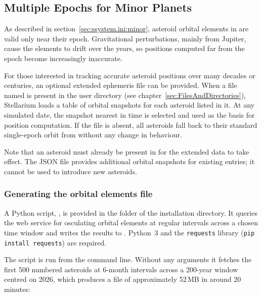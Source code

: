 \subsection{Multiple Epochs for Minor Planets}
\label{sec:ssystem.ini:MultiEpoch}
 
As described in section~\ref{sec:ssystem.ini:minor}, asteroid orbital
elements in  are valid only near their epoch.
Gravitational perturbations, mainly from Jupiter, cause the elements to
drift over the years, so positions computed far from the epoch become
increasingly inaccurate.
 
For those interested in tracking accurate asteroid positions over many
decades or centuries, an optional extended ephemeris file can be
provided.  When a file named  is present
in the user  directory (see
chapter~\ref{sec:FilesAndDirectories}), Stellarium loads a table of
orbital snapshots for each asteroid listed in it.  At any simulated
date, the snapshot nearest in time is selected and used as the basis for
position computation.  If the file is absent, all asteroids fall back to
their standard single-epoch orbit from 
without any change in behaviour.
 
Note that an asteroid must already be present in
 for the extended data to take effect.  The
JSON file provides additional orbital snapshots for existing entries; it
cannot be used to introduce new asteroids.
 
\subsubsection{Generating the orbital elements file}
\label{sec:ssystem.ini:MultiEpoch:Script}
 
A Python script, , is provided in
the  folder of the installation directory.  It queries the
 web service for osculating orbital elements at
regular intervals across a chosen time window and writes the results to
.  Python~3 and the \texttt{requests}
library (\texttt{pip install requests}) are required.
 
The script is run from the command line.  Without any arguments it
fetches the first 500 numbered asteroids at 6-month intervals across a
200-year window centred on 2026, which produces a file of approximately
52\,MB in around 20 minutes:
 
